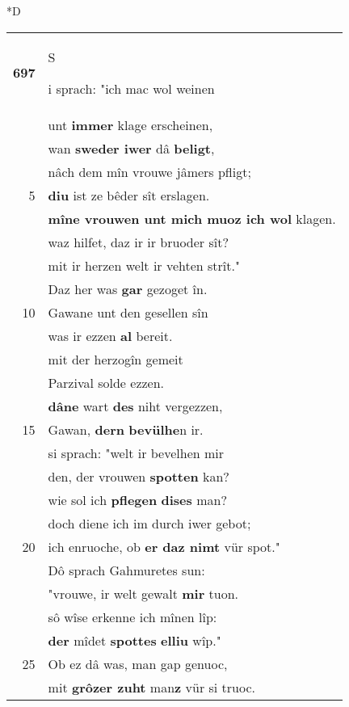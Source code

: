 \documentclass[8pt,a4paper,notitlepage]{article}
\begin{document}
\begin{table}[ht]
\begin{minipage}[t]{0.5\linewidth}
\small
\begin{center}*D
\end{center}
\begin{tabular}{rl}
\textbf{697} & \begin{large}S\end{large}i sprach: "ich mac wol weinen\\ 
 & unt \textbf{immer} klage erscheinen,\\ 
 & wan \textbf{sweder iwer} dâ \textbf{beligt},\\ 
 & nâch dem mîn vrouwe jâmers pfligt;\\ 
5 & \textbf{diu} ist ze bêder sît erslagen.\\ 
 & \textbf{mîne vrouwen unt mich muoz ich wol} klagen.\\ 
 & waz hilfet, daz ir ir bruoder sît?\\ 
 & mit ir herzen welt ir vehten strît."\\ 
 & Daz her was \textbf{gar} gezoget în.\\ 
10 & Gawane unt den gesellen sîn\\ 
 & was ir ezzen \textbf{al} bereit.\\ 
 & mit der herzogîn gemeit\\ 
 & Parzival solde ezzen.\\ 
 & \textbf{dâ}\textbf{ne} wart \textbf{des} niht vergezzen,\\ 
15 & Gawan, \textbf{der}\textbf{n} \textbf{bevülhe}n ir.\\ 
 & si sprach: "welt ir bevelhen mir\\ 
 & den, der vrouwen \textbf{spotten} kan?\\ 
 & wie sol ich \textbf{pflegen} \textbf{dises} man?\\ 
 & doch diene ich im durch iwer gebot;\\ 
20 & ich enruoche, ob \textbf{er daz nimt} vür spot."\\ 
 & Dô sprach Gahmuretes sun:\\ 
 & "vrouwe, ir welt gewalt \textbf{mir} tuon.\\ 
 & sô wîse erkenne ich mînen lîp:\\ 
 & \textbf{der} mîdet \textbf{spottes} \textbf{elliu} wîp."\\ 
25 & Ob ez dâ was, man gap genuoc,\\ 
 & mit \textbf{grôzer zuht} man\textbf{z} vür si truoc.\\ 

\end{tabular}
\end{minipage}
\end{table}
\end{document}
